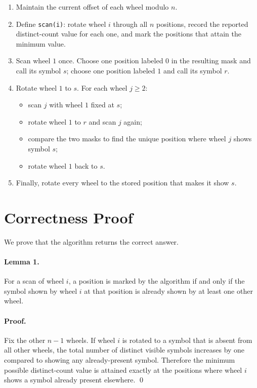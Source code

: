 \documentclass[11pt]{article}
\begin{document}
\begin{enumerate}[leftmargin=*]
    \item Maintain the current offset of each wheel modulo $n$.
    \item Define \texttt{scan(i)}:
    rotate wheel $i$ through all $n$ positions, record the reported distinct-count value for each one, and
    mark the positions that attain the minimum value.
    \item Scan wheel $1$ once. Choose one position labeled $0$ in the resulting mask and call its symbol
    $s$; choose one position labeled $1$ and call its symbol $r$.
    \item Rotate wheel $1$ to $s$. For each wheel $j \ge 2$:
    \begin{itemize}[leftmargin=*]
        \item scan $j$ with wheel $1$ fixed at $s$;
        \item rotate wheel $1$ to $r$ and scan $j$ again;
        \item compare the two masks to find the unique position where wheel $j$ shows symbol $s$;
        \item rotate wheel $1$ back to $s$.
    \end{itemize}
    \item Finally, rotate every wheel to the stored position that makes it show $s$.
\end{enumerate}

\section*{Correctness Proof}

We prove that the algorithm returns the correct answer.

\paragraph{Lemma 1.}
For a scan of wheel $i$, a position is marked by the algorithm if and only if the symbol shown by wheel
$i$ at that position is already shown by at least one other wheel.

\paragraph{Proof.}
Fix the other $n-1$ wheels. If wheel $i$ is rotated to a symbol that is absent from all other wheels, the
total number of distinct visible symbols increases by one compared to showing any already-present
symbol. Therefore the minimum possible distinct-count value is attained exactly at the positions where
wheel $i$ shows a symbol already present elsewhere. \qed
\end{document}
